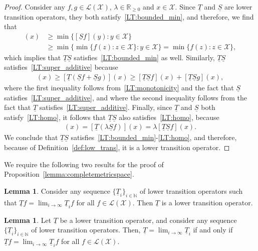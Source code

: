 \documentclass[10pt,a4paper]{paper}
\theoremstyle{definition}
\newtheorem{lemma}[theorem]{Lemma}
\newcommand{\nats}{\mathbb{N}}
\newcommand{\reals}{\mathbb{R}}
\newcommand{\realsnonneg}{\reals_{\geq 0}}
\newcommand{\states}{\mathcal{X}}
\newcommand{\lt}{\underline{T}}
\newcommand{\gambles}{\mathcal{L}}
\newcommand{\gamblesX}{\gambles(\states)}
\begin{document}
\lemmacompositioncoherence*
\begin{proof}
Consider any $f,g\in\gamblesX$, $\lambda\in\realsnonneg$ and $x\in\states$. Since $\underline{T}$ and $\underline{S}$ are lower transition operators, they both satisfy~\ref{LT:bounded_min}, and therefore, we find that
\begin{align*}
[\underline{T}\underline{S}f](x)
&\geq
\min\{[\underline{S}f](y)\colon y\in\states\}\\
&\geq
\min\{\min\{f(z)\colon z\in\states\}\colon y\in\states\}
=
\min\{f(z)\colon z\in\states\},
\end{align*}
which implies that $\underline{T}\underline{S}$ satisfies~\ref{LT:bounded_min} as well. 
Similarly, $\underline{T}\underline{S}$ satisfies~\ref{LT:super_additive} because
\begin{align*}
[\underline{T}\underline{S}(f+g)](x)
\geq
[\underline{T}(\underline{S}f+\underline{S}g)](x)
\geq
[\underline{T}\underline{S}f](x)
+
[\underline{T}\underline{S}g](x),
\end{align*}
where the first inequality follows from~\ref{LT:monotonicity} and the fact that $\underline{S}$ satisfies~\ref{LT:super_additive}, and where the second inequality follows from the fact that $\underline{T}$ satisfies~\ref{LT:super_additive}.
Finally, since $\underline{T}$ and $\underline{S}$ both satisfy~\ref{LT:homo}, it follows that $\underline{T}\underline{S}$ also satisfies~\ref{LT:homo}, because
\begin{align*}
[\underline{T}\underline{S}(\lambda f)](x)
=
[\underline{T}(\lambda\underline{S}f)](x)
=
\lambda[\underline{T}\underline{S}f](x).
\end{align*}
We conclude that $\underline{T}\underline{S}$ satisfies~\ref{LT:bounded_min}-\ref{LT:homo}, and therefore, because of Definition~\ref{def:low_trans}, it is a lower transition operator.
\end{proof}

We require the following two results for the proof of Proposition~\ref{lemma:completemetricspace}.

\begin{lemma}\cite[Proposition~1]{DeBock:2016}\label{lemma:lowertrans_if_pointwise_limit}
Consider any sequence $\{\lt_i\}_{i\in\nats}$ of lower transition operators such that $\lt f=\lim_{i\to\infty}\lt_i f$ for all $f\in\gamblesX$. Then $\lt$ is a lower transition operator.
\end{lemma}

\begin{lemma}\cite[Proposition~2]{DeBock:2016}\label{lemma:lowertrans_limit_iff_pointwise_limit}
Let $\lt$ be a lower transition operator, and consider any sequence $\{\lt_i\}_{i\in\nats}$ of lower transition operators. Then, $\lt=\lim_{i\to\infty}\lt_i$ if and only if $\lt f=\lim_{i\to\infty}\lt_i f$ for all $f\in\gamblesX$.
\end{lemma}
\end{document}
